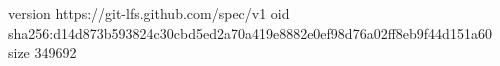 version https://git-lfs.github.com/spec/v1
oid sha256:d14d873b593824c30cbd5ed2a70a419e8882e0ef98d76a02ff8eb9f44d151a60
size 349692
